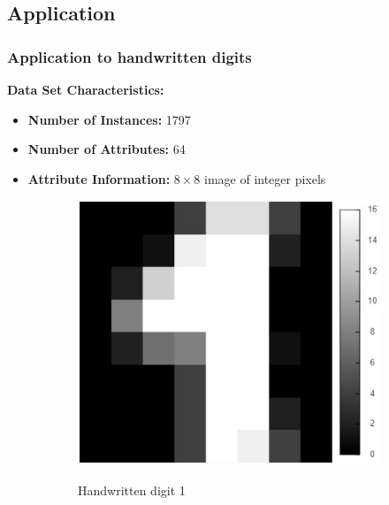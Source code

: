 \documentclass{beamer}
\theoremstyle{plain}
\theoremstyle{definition}
\begin{document}
\subsection{Application}

\begin{frame}
\frametitle{Application to handwritten digits}
\textbf{Data Set Characteristics:}
\begin{itemize}
\item \textbf{Number of Instances:} 1797
\item \textbf{Number of Attributes:} 64
\item \textbf{Attribute Information:} $8 \times 8$ image of integer pixels
\end{itemize}

\begin{figure}
\centering
	\begin{subfigure}{0.45\textwidth}
	\centering
	\captionsetup{justification=centering}
	\includegraphics[width = \textwidth]{figures/handwritten_digits_dataset_1.jpg}
	\label{pca_example_original}
	\caption{Handwritten digit 1}
	\end{subfigure}
	\begin{subfigure}{0.45\textwidth}
	\centering
	\captionsetup{justification=centering}

\end{subfigure}
\end{figure}
\end{frame}
\end{document}
